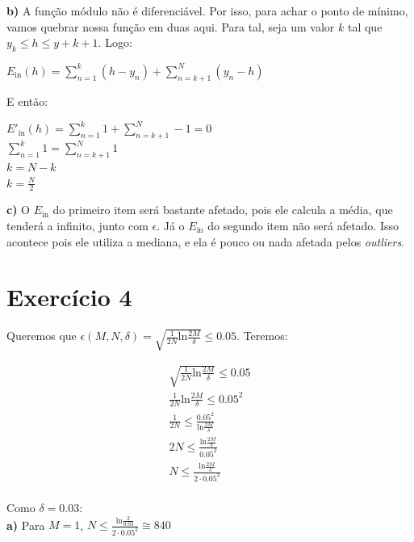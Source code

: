 \documentclass[12pt,letterpaper]{article}
\begin{document}
	\textbf{b)} A função módulo não é diferenciável. Por isso, para achar o ponto de mínimo, vamos quebrar nossa função em duas aqui. Para tal, seja um valor $ k $ tal que $ y_k \leq h \leq y+{k+1} $. Logo:
	
	\begin{center} 
		$E_{\text{in}}(h) = \sum_{n=1}^{k} (h-y_n) +  \sum_{n=k+1}^{N} (y_n-h) $\\
	\end{center}
	
	E então:
	
	\begin{center} 
		$E'_{\text{in}}(h) = \sum_{n=1}^{k} 1 +  \sum_{n=k+1}^{N} -1 = 0$\\
		$ \sum_{n=1}^{k} 1 = \sum_{n=k+1}^{N} 1 $\\
		$k = N-k$ \\
		$k = \frac{N}{2}$
	\end{center}
	
	\textbf{c)} O $E_{\text{in}}$ do primeiro item será bastante afetado, pois ele calcula a média, que tenderá a infinito, junto com $ \epsilon $. Já o $ E_\text{in} $ do segundo item não será afetado. Isso acontece pois ele utiliza a mediana, e ela é pouco ou nada afetada pelos \textit{outliers}.
	
	\section*{Exercício 4}
	
	Queremos que $\epsilon(M, N, \delta) = \sqrt{\frac{1}{2N} \text{ln} \frac{2M}{\delta}} \leq 0.05$. Teremos:
	
	\begin{equation*}
		\begin{split}
			\sqrt{\frac{1}{2N} \text{ln} \frac{2M}{\delta}} \leq 0.05 \\
			\frac{1}{2N} \text{ln} \frac{2M}{\delta} \leq 0.05^2 \\
			\frac{1}{2N} \leq \frac{0.05^2}{\text{ln} \frac{2M}{\delta}} \\
			2N \leq \frac{\text{ln} \frac{2M}{\delta}}{0.05^2} \\
			N \leq \frac{\text{ln} \frac{2M}{\delta}}{2 \cdot 0.05^2} \\
		\end{split}
	\end{equation*}
	
	Como $\delta = 0.03$: \\
	
	\textbf{a)} Para $M = 1$, $N \leq \frac{\text{ln} \frac{2}{0.03}}{2 \cdot 0.05^2} \cong 840$
	
\end{document}
